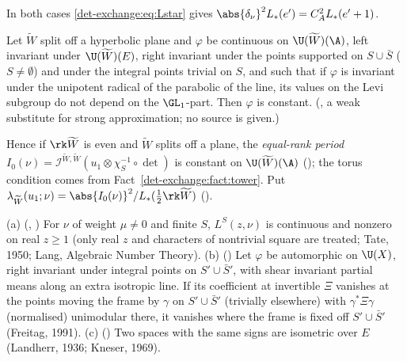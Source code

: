 In both cases \eqref{det-exchange:eq:Lstar} gives $\abs{\delta_\nu}^2L_*(e')=C_A^2L_*(e'+1)$.

\begin{fact}
\label{det-exchange:fact:const}
Let $\widetilde W$ split off a hyperbolic plane and $\varphi$ be continuous on $\U(\widetilde W)(\A)$, left invariant
under $\U(\widetilde W)(E)$, right invariant under the points supported on $S\cup\bar S$ ($S\ne\emptyset$) and
under the integral points trivial on $S$, and such that if $\varphi$ is invariant under the unipotent
radical of the parabolic of the line, its values on the Levi subgroup do not depend on the
$\GL_1$-part. Then $\varphi$ is constant. (, a weak
substitute for strong approximation; no source is given.)
\end{fact}

Hence if $\rk \widetilde W$ is even and $\widetilde W$ splits off a plane, the \emph{equal-rank period}
$I_0(\nu)=\mathcal I^{\widetilde W,\widetilde W}(u_1\otimes\chi_S^{-1}\circ\det)$ is constant on $\U(\widetilde W)(\A)$
(); the torus condition comes from
Fact~\ref{det-exchange:fact:tower}. Put
$\lambda_{\widetilde W}(u_1;\nu)=\abs{I_0(\nu)}^2/L_*(\tfrac12\rk \widetilde W)$
().

\begin{fact}\label{det-exchange:fact:lib}
(a) (, ) For
$\nu$ of weight $\mu\ne0$ and finite $S$, $L^S(z,\nu)$ is continuous and nonzero on real
$z\ge1$ (only real $z$ and characters of nontrivial square are treated; Tate, 1950; Lang, Algebraic
Number Theory). (b) () Let $\varphi$ be automorphic
on $\U(X)$, right invariant under integral points on $S'\cup\bar S'$, with shear invariant partial
means along an extra isotropic line. If its coefficient at invertible $\Xi$ vanishes at the points
moving the frame by $\gamma$ on $S'\cup\bar S'$ (trivially elsewhere) with $\gamma^*\Xi\gamma$
(normalised) unimodular there, it vanishes where the frame is fixed off $S'\cup\bar S'$ (Freitag, 1991). (c) () Two spaces
with the same signs are isometric over $E$ (Landherr, 1936; Kneser, 1969).
\end{fact}

